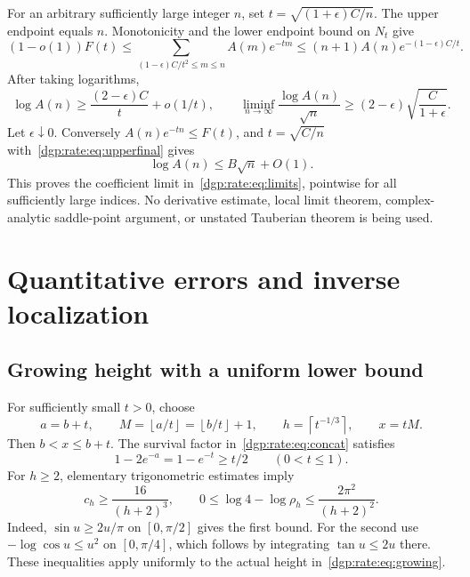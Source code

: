 \documentclass[11pt,letterpaper]{article}
\numberwithin{equation}{section}
\theoremstyle{remark}\newtheorem{remark}[theorem]{Remark}
\newcommand{\floor}[1]{\left\lfloor #1\right\rfloor}
\newcommand{\ceil}[1]{\left\lceil #1\right\rceil}
\begin{document}
For an arbitrary sufficiently large integer $n$, set
$t=\sqrt{(1+\epsilon)C/n}$. The upper endpoint equals $n$. Monotonicity
and the lower endpoint bound on $N_t$ give
\begin{equation}\label{dgp:rate:eq:centralbound}
 (1-o(1))F(t)
 \leq\sum_{(1-\epsilon)C/t^2\leq m\leq n}A(m)e^{-tm}
 \leq(n+1)A(n)e^{-(1-\epsilon)C/t}.
\end{equation}
After taking logarithms,
\[
 \log A(n)\geq\frac{(2-\epsilon)C}{t}+o(1/t),\qquad
 \liminf_{n\to\infty}\frac{\log A(n)}{\sqrt n}
 \geq(2-\epsilon)\sqrt{\frac{C}{1+\epsilon}}.
\]
Let $\epsilon\downarrow0$. Conversely $A(n)e^{-tn}\leq F(t)$, and
$t=\sqrt{C/n}$ with~\eqref{dgp:rate:eq:upperfinal} gives
\begin{equation}\label{dgp:rate:eq:coefupper}
 \log A(n)\leq B\sqrt n+O(1).
\end{equation}
This proves the coefficient limit in~\eqref{dgp:rate:eq:limits}, pointwise for all
sufficiently large indices. No derivative estimate, local limit theorem,
complex-analytic saddle-point argument, or unstated Tauberian theorem is
being used.

\section{Quantitative errors and inverse localization}\label{dgp:rate:sec:errors}
\subsection{Growing height with a uniform lower bound}
For sufficiently small $t>0$, choose
\begin{equation}\label{dgp:rate:eq:growing}
 a=b+t,\qquad M=\floor{a/t}=\floor{b/t}+1,\qquad
 h=\ceil{t^{-1/3}},\qquad x=tM.
\end{equation}
Then $b<x\leq b+t$. The survival factor in~\eqref{dgp:rate:eq:concat} satisfies
\begin{equation}\label{dgp:rate:eq:delta}
 1-2e^{-a}=1-e^{-t}\geq t/2\qquad(0<t\leq1).
\end{equation}
For $h\geq2$, elementary trigonometric estimates imply
\begin{equation}\label{dgp:rate:eq:uniformspectral}
 c_h\geq\frac{16}{(h+2)^3},\qquad
 0\leq\log4-\log\rho_h\leq\frac{2\pi^2}{(h+2)^2}.
\end{equation}
Indeed, $\sin u\geq2u/\pi$ on $[0,\pi/2]$ gives the first bound.
For the second use $-\log\cos u\leq u^2$ on $[0,\pi/4]$, which follows
by integrating $\tan u\leq2u$ there. These inequalities apply uniformly
to the actual height in~\eqref{dgp:rate:eq:growing}.
\end{document}
